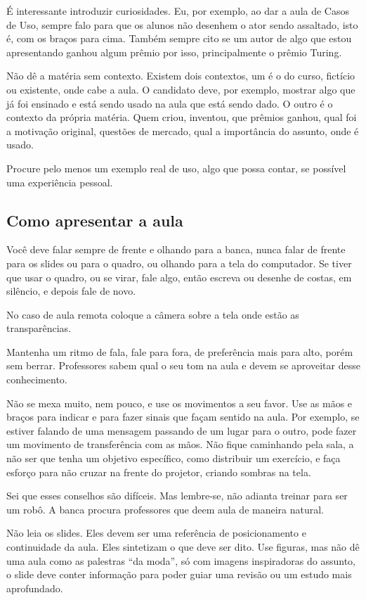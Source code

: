 \documentclass{article}
\begin{document}
É interessante introduzir curiosidades. Eu, por exemplo, ao dar a aula de Casos de Uso, sempre falo para que os alunos não desenhem o ator sendo assaltado, isto é, com os braços para cima. Também sempre cito se um autor de algo que estou apresentando ganhou algum prêmio por isso, principalmente o prêmio Turing.

Não dê a matéria sem contexto. Existem dois contextos, um é o do curso, fictício ou existente, onde cabe a aula. O candidato deve, por exemplo, mostrar algo que já foi ensinado e está sendo usado na aula que está sendo dado. O outro é o contexto da própria matéria. Quem criou, inventou, que prêmios ganhou, qual foi a motivação original, questões de mercado, qual a importância do assunto, onde é usado.

Procure pelo menos um exemplo real de uso, algo que possa contar, se possível uma experiência pessoal.

\subsection{Como apresentar a aula}

Você deve falar sempre de frente e olhando para a banca, nunca falar de frente para os slides ou para o quadro, ou olhando para a tela do computador. Se tiver que usar o quadro, ou se virar, fale algo, então escreva ou desenhe de costas, em silêncio, e depois fale de novo. 

No caso de aula remota coloque a câmera sobre a tela onde estão as transparências.

Mantenha um ritmo de fala, fale para fora, de preferência mais para alto, porém sem berrar. Professores sabem qual o seu tom na aula e devem se aproveitar desse conhecimento.

Não se mexa muito, nem pouco, e use os movimentos a seu favor.  Use as mãos e braços para indicar e para fazer sinais que façam sentido na aula. Por exemplo, se estiver falando de uma mensagem passando de um lugar para o outro, pode fazer um movimento de transferência com as mãos. Não fique caminhando pela sala, a não ser que tenha um objetivo específico, como distribuir um exercício, e faça esforço para não cruzar na frente do projetor, criando sombras na tela. 

Sei que esses conselhos são difíceis. Mas lembre-se, não adianta treinar para ser um robô. A banca procura professores que deem aula de maneira natural. 


Não leia os slides. Eles devem ser uma referência de posicionamento e continuidade da aula. Eles sintetizam o que deve ser dito. Use figuras, mas não dê uma aula como as palestras ``da moda'', só com imagens inspiradoras do assunto, o slide deve conter informação para poder guiar uma revisão ou um estudo mais aprofundado.
\end{document}
